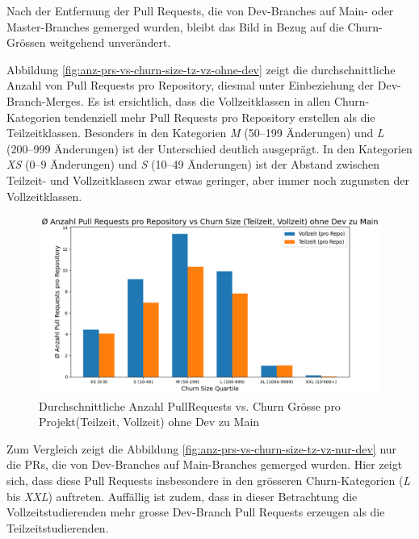 Nach der Entfernung der Pull Requests, die von Dev-Branches auf Main- oder Master-Branches gemerged wurden, bleibt das Bild in Bezug auf die Churn-Grössen weitgehend unverändert.

Abbildung \autoref{fig:anz-prs-vs-churn-size-tz-vz-ohne-dev} zeigt die durchschnittliche Anzahl von Pull Requests pro Repository, diesmal unter Einbeziehung der Dev-Branch-Merges. Es ist ersichtlich, dass die Vollzeitklassen in allen Churn-Kategorien tendenziell mehr Pull Requests pro Repository erstellen als die Teilzeitklassen. Besonders in den Kategorien \textit{M} (50–199 Änderungen) und \textit{L} (200–999 Änderungen) ist der Unterschied deutlich ausgeprägt. In den Kategorien \textit{XS} (0–9 Änderungen) und \textit{S} (10–49 Änderungen) ist der Abstand zwischen Teilzeit- und Vollzeitklassen zwar etwas geringer, aber immer noch zugunsten der Vollzeitklassen.

\begin{figure}[htbp]
    \includegraphics[width=\textwidth]{Figures/avg-anz-prs-vs-churn-size-tz-vz-pro-repo-ohne-dev.png}
    \caption{Durchschnittliche Anzahl PullRequests vs. Churn Grösse pro Projekt(Teilzeit, Vollzeit) ohne Dev zu Main}
    \label{fig:anz-prs-vs-churn-size-tz-vz-ohne-dev}
\end{figure}

Zum Vergleich zeigt die Abbildung \autoref{fig:anz-prs-vs-churn-size-tz-vz-nur-dev} nur die PRs, die von Dev-Branches auf Main-Branches gemerged wurden. Hier zeigt sich, dass diese Pull Requests insbesondere in den grösseren Churn-Kategorien (\textit{L} bis \textit{XXL}) auftreten. Auffällig ist zudem, dass in dieser Betrachtung die Vollzeitstudierenden mehr grosse Dev-Branch Pull Requests erzeugen als die Teilzeitstudierenden.

